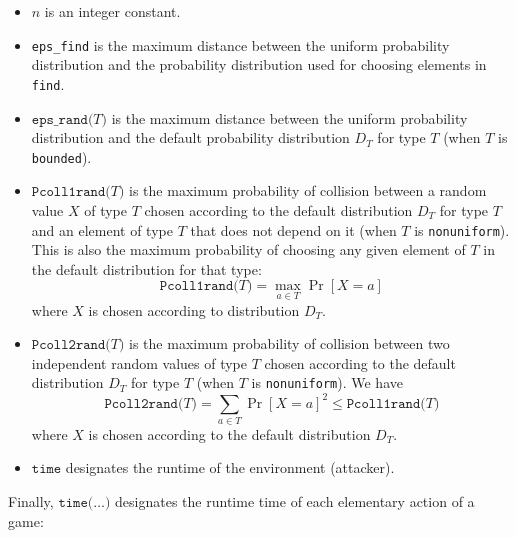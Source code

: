 \begin{itemize}
\item $n$ is an integer constant.

\item \texttt{eps\_find} is the maximum distance between the uniform probability
distribution and the probability distribution used for choosing elements
in {\tt find}.

\item $\texttt{eps\_rand(}T\texttt{)}$ is the maximum distance between the 
uniform probability distribution and the default probability distribution 
$D_T$ for type $T$ (when $T$ is \texttt{bounded}).

\item 
$\texttt{Pcoll1rand(}T\texttt{)}$ is the maximum probability of
collision between a random value $X$ of type $T$ chosen according
to the default distribution $D_T$ for type $T$ and an element of type $T$
that does not depend on it (when $T$ is \texttt{nonuniform}).
This is also the maximum probability of choosing any given element of 
$T$ in the default distribution for that type:
\[\texttt{Pcoll1rand(}T\texttt{)} = \max_{a \in T} \Pr[X = a]\]
where $X$ is chosen according to distribution $D_T$.

\item $\texttt{Pcoll2rand(}T\texttt{)}$ is the maximum probability of
collision between two independent random values of type $T$  
chosen according to the default distribution $D_T$ for type $T$
(when $T$ is \texttt{nonuniform}). We have
\[\texttt{Pcoll2rand(}T\texttt{)} = \sum_{a \in T} \Pr[X = a]^2 \leq \texttt{Pcoll1rand(}T\texttt{)}\]
where $X$ is chosen according to the default distribution $D_T$.

\item $\texttt{time}$ designates the runtime of the environment (attacker).

\end{itemize}
Finally, $\texttt{time(}\ldots\texttt{)}$ designates the runtime time of each
elementary action of a game:
